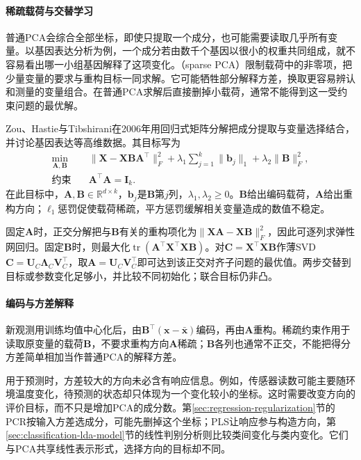 \label{sec:dim-sparse-pca}

\paragraph{稀疏载荷与交替学习}

普通PCA会综合全部坐标，即使只提取一个成分，也可能需要读取几乎所有变量。以基因表达分析为例，一个成分若由数千个基因以很小的权重共同组成，就不容易看出哪一小组基因解释了这项变化。（sparse PCA）限制载荷中的非零项，把少量变量的要求与重构目标一同求解。它可能牺牲部分解释方差，换取更容易辨认和测量的变量组合。在普通PCA求解后直接删掉小载荷，通常不能得到这一受约束问题的最优解。

Zou、Hastie与Tibshirani在2006年用回归式矩阵分解把成分提取与变量选择结合，并讨论基因表达等高维数据。其目标写为
\begin{equation}
  \begin{aligned}
  \min_{\bm{A},\bm{B}}\quad&
    \lVert\bm{X}-\bm{X}\bm{B}\bm{A}^{\top}\rVert_F^2
    +\lambda_1\sum_{j=1}^{k}\lVert\bm{b}_j\rVert_1
    +\lambda_2\lVert\bm{B}\rVert_F^2,\\
  \text{约束}\quad&\bm{A}^{\top}\bm{A}=\bm{I}_k.
  \end{aligned}
  \label{eq:dim-sparse-pca}
\end{equation}
在此目标中，$\bm{A},\bm{B}\in\mathbb{R}^{d\times k}$，$\bm{b}_j$是$\bm{B}$第$j$列，$\lambda_1,\lambda_2\geq0$。$\bm{B}$给出编码载荷，$\bm{A}$给出重构方向；$\ell_1$惩罚促使载荷稀疏，平方惩罚缓解相关变量造成的数值不稳定。

固定$\bm A$时，正交分解把与$\bm B$有关的重构项化为$\lVert\bm X\bm A-\bm X\bm B\rVert_F^2$，因此可逐列求弹性网回归。固定$\bm B$时，则最大化$\operatorname{tr}(\bm A^\top\bm X^\top\bm X\bm B)$。对$\bm C=\bm X^\top\bm X\bm B$作薄SVD $\bm C=\bm U_C\bm\Lambda_C\bm V_C^\top$，取$\bm A=\bm U_C\bm V_C^\top$即可达到该正交对齐子问题的最优值。两步交替到目标或参数变化足够小，并比较不同初始化；联合目标仍非凸。

\paragraph{编码与方差解释}

新观测用训练均值中心化后，由$\bm B^\top(\bm x-\bar{\bm x})$编码，再由$\bm A$重构。稀疏约束作用于读取原变量的载荷$\bm B$，不要求重构方向$\bm A$稀疏；$\bm B$各列也通常不正交，不能把得分方差简单相加当作普通PCA的解释方差。

用于预测时，方差较大的方向未必含有响应信息。例如，传感器读数可能主要随环境温度变化，待预测的状态却只体现为一个变化较小的坐标。这时需要改变方向的评价目标，而不只是增加PCA的成分数。第\ref{sec:regression-regularization}节的PCR按输入方差选成分，可能先删掉这个坐标；PLS让响应参与构造方向，第\ref{sec:classification-lda-model}节的线性判别分析则比较类间变化与类内变化。它们与PCA共享线性表示形式，选择方向的目标却不同。

